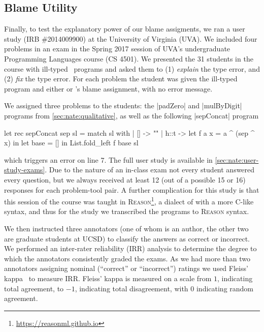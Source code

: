 \subsection{Blame Utility}
\label{sec:nate:user-study}
Finally, to test the explanatory power of our blame assigments, we
ran a user study (IRB \#2014009900) at the University of Virginia (UVA).
%
We included four problems in an exam in the Spring 2017 session of UVA's
undergraduate Programming Languages course (CS 4501).
%
We presented the 31 students in the course with ill-typed \ocaml\
programs and asked them to
%
(1) \emph{explain} the type error, and
%
(2) \emph{fix} the type error.
%
For each problem the student was given the ill-typed program and
either \sherrloc or \toolname's blame assignment, with no error message.

We assigned three problems to the students: the |padZero| and
|mulByDigit| programs from \autoref{sec:nate:qualitative}, as well as
the following |sepConcat| program
%
\begin{ecode}
  let rec sepConcat sep sl =
    match sl with
    | [] -> ""
    | h::t ->
        let f a x = a ^ (sep ^ x) in
        let base = [] in
        List.fold_left f base sl
\end{ecode}
%
which triggers an error on line 7.
%
%
The full user study is available in \autoref{sec:nate:user-study-exams}.
%
Due to the nature of an in-class exam not every student answered every
question, but we always received at least 12 (out of a possible 15 or
16) responses for each problem-tool pair.
%
A further complication for this study is that this session of the course
was taught in \textsc{Reason}\footnote{\url{https://reasonml.github.io}},
a dialect of \ocaml with a more C-like syntax, and thus for the study
we transcribed the programs to \textsc{Reason} syntax.

We then instructed three annotators (one of whom is an author, the other
two are graduate students at UCSD) to classify the answers as
correct or incorrect.
%
We performed an inter-rater reliability (IRR) analysis to determine the
degree to which the annotators consistently graded the exams.
%
As we had more than two annotators assigning nominal (``correct'' or
``incorrect'') ratings we used Fleiss' kappa~\cite{Fleiss1971-du} to
measure IRR.\@
%
Fleiss' kappa is measured on a scale from $1$, indicating total
agreement, to $-1$, indicating total disagreement, with $0$ indicating
random agreement.

